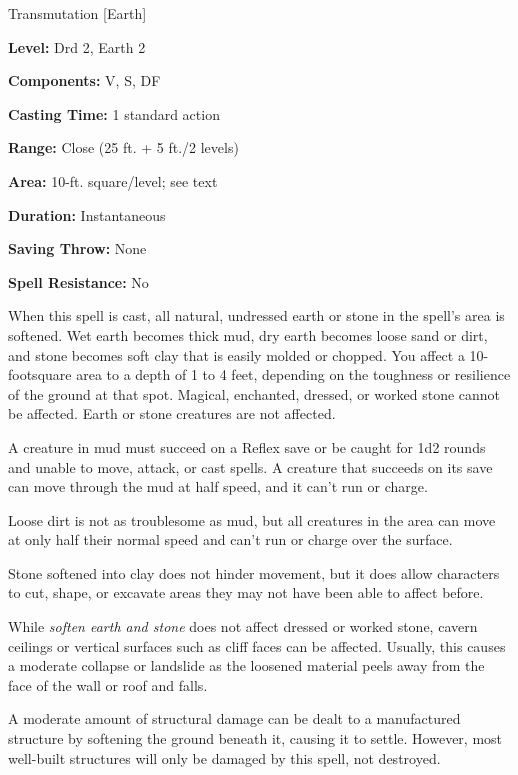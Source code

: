 
Transmutation [Earth]

\textbf{Level:} Drd 2, Earth 2

\textbf{Components:} V, S, DF

\textbf{Casting Time:} 1 standard action

\textbf{Range:} Close (25 ft. + 5 ft./2 levels)

\textbf{Area:} 10-ft. square/level; see text

\textbf{Duration:} Instantaneous

\textbf{Saving Throw:} None

\textbf{Spell Resistance:} No

When this spell is cast, all natural, undressed earth or stone in the spell's area 
is softened. Wet earth becomes thick mud, dry earth becomes loose sand or dirt, 
and stone becomes soft clay that is easily molded or chopped. You affect a 10-footsquare 
area to a depth of 1 to 4 feet, depending on the toughness or resilience of the 
ground at that spot. Magical, enchanted, dressed, or worked stone cannot be affected. 
Earth or stone creatures are not affected.

A creature in mud must succeed on a Reflex save or be caught for 1d2 rounds and 
unable to move, attack, or cast spells. A creature that succeeds on its save can 
move through the mud at half speed, and it can't run or charge.

Loose dirt is not as troublesome as mud, but all creatures in the area can move 
at only half their normal speed and can't run or charge over the surface.

Stone softened into clay does not hinder movement, but it does allow characters 
to cut, shape, or excavate areas they may not have been able to affect before.

While \textit{soften earth and stone} does not affect dressed or worked stone, 
cavern ceilings or vertical surfaces such as cliff faces can be affected. Usually, 
this causes a moderate collapse or landslide as the loosened material peels away 
from the face of the wall or roof and falls.

A moderate amount of structural damage can be dealt to a manufactured structure 
by softening the ground beneath it, causing it to settle. However, most well-built 
structures will only be damaged by this spell, not destroyed.

